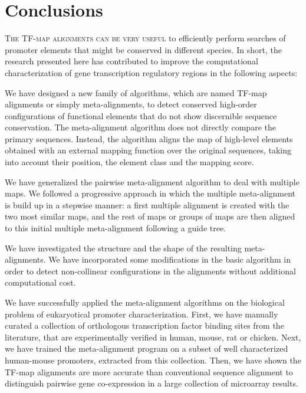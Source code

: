 \chapter[Conclusions]{\textbf{C}onclusions}\label{sec:conclusions}

\lettrine[lines=4,loversize=-0.1,lraise=0.1,lhang=.2]{T}{he TF-map alignments can be very useful} to
efficiently perform searches of promoter elements that might be conserved in different species. In short, 
the research presented here has contributed to improve the computational characterization of gene 
transcription regulatory regions in the following aspects:

\begin{menumerate}
\item
We have designed a new family of algorithms, which are named TF-map alignments or simply 
meta-alignments, to detect conserved high-order configurations of functional elements that do not show 
discernible sequence conservation. The meta-alignment algorithm does not directly 
compare the primary sequences. Instead, the algorithm aligns the map of high-level
elements obtained with an external mapping function over the original sequences, taking 
into account their position, the element class and the mapping score.

\item
We have generalized the pairwise meta-alignment algorithm to deal with multiple maps.
We followed a progressive approach in which the multiple meta-alignment is build up in
a stepwise manner: a first multiple alignment is created with the two most similar maps,
and the rest of maps or groups of maps are then aligned to this initial multiple meta-alignment
following a guide tree.

\item
We have investigated the structure and the shape of the resulting meta-alignments. We have
incorporated some modifications in the basic algorithm in order to detect non-collinear 
configurations in the alignments without additional computational cost.

\item
We have successfully applied the meta-alignment algorithms on the biological problem of 
eukaryotical promoter characterization. First, we have manually curated a collection of
orthologous transcription factor binding sites from the literature, that are experimentally 
verified in human, mouse, rat or chicken. Next, we have trained the meta-alignment program
on a subset of well characterized human-mouse promoters, extracted from this collection.
Then, we have shown the TF-map alignments are more accurate than conventional sequence 
alignment to distinguish pairwise gene co-expression in a large collection of microarray results. 


\end{menumerate}
